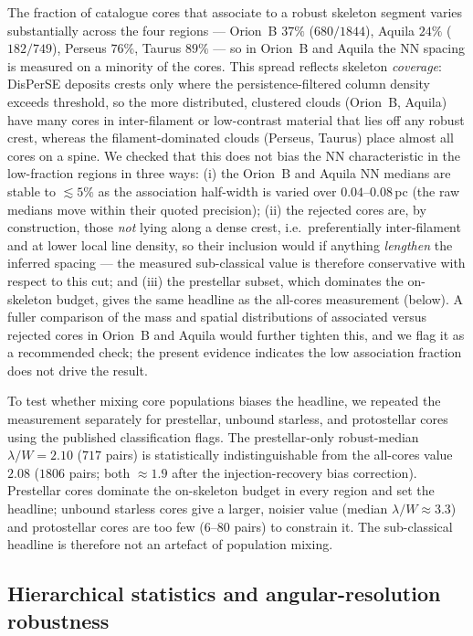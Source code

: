 \documentclass[usenatbib,twoside,twocolumn]{mnras}
\begin{document}
The fraction of catalogue cores that associate to a robust skeleton segment varies substantially across the four regions --- Orion~B $37\%$ ($680/1844$), Aquila $24\%$ ($182/749$), Perseus $76\%$, Taurus $89\%$ --- so in Orion~B and Aquila the NN spacing is measured on a minority of the cores. This spread reflects skeleton \emph{coverage}: DisPerSE deposits crests only where the persistence-filtered column density exceeds threshold, so the more distributed, clustered clouds (Orion~B, Aquila) have many cores in inter-filament or low-contrast material that lies off any robust crest, whereas the filament-dominated clouds (Perseus, Taurus) place almost all cores on a spine. We checked that this does not bias the NN characteristic in the low-fraction regions in three ways: (i) the Orion~B and Aquila NN medians are stable to $\lesssim5\%$ as the association half-width is varied over $0.04$--$0.08$\,pc (the raw medians move within their quoted precision); (ii) the rejected cores are, by construction, those \emph{not} lying along a dense crest, i.e.\ preferentially inter-filament and at lower local line density, so their inclusion would if anything \emph{lengthen} the inferred spacing --- the measured sub-classical value is therefore conservative with respect to this cut; and (iii) the prestellar subset, which dominates the on-skeleton budget, gives the same headline as the all-cores measurement (below). A fuller comparison of the mass and spatial distributions of associated versus rejected cores in Orion~B and Aquila would further tighten this, and we flag it as a recommended check; the present evidence indicates the low association fraction does not drive the result.

To test whether mixing core populations biases the headline, we repeated the measurement separately for prestellar, unbound starless, and protostellar cores using the published classification flags. The prestellar-only robust-median $\lambda/W=2.10$ ($717$ pairs) is statistically indistinguishable from the all-cores value $2.08$ ($1806$ pairs; both $\approx1.9$ after the injection-recovery bias correction). Prestellar cores dominate the on-skeleton budget in every region and set the headline; unbound starless cores give a larger, noisier value (median $\lambda/W\approx3.3$) and protostellar cores are too few ($6$--$80$ pairs) to constrain it. The sub-classical headline is therefore not an artefact of population mixing.

\subsection{Hierarchical statistics and angular-resolution robustness}
\end{document}
